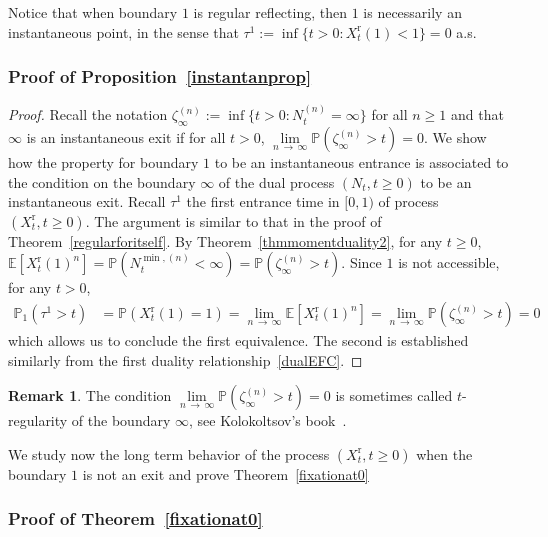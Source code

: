 \documentclass[10pt]{amsart}
\theoremstyle{definition}\newtheorem{defi}[theo]{Definition}\newtheorem{rema}[theo]{Remark}\newtheorem{exam}[theo]{Example}\newtheorem{exem}[theo]{Example}\newtheorem{nota}[theo]{Notation}
\newcommand{\rmr}{\mathrm{r}}
\newcommand{\bbE}{\mathbb{E}}
\newcommand{\bbP}{\mathbb{P}}
\begin{document}
Notice that when boundary $1$ is regular reflecting, then $1$ is necessarily an instantaneous point, in the sense that $\tau^{1}:=\inf\{t>0: X_t^{\rmr}(1)<1\}=0$ a.s.


\subsubsection{Proof of Proposition~\ref{instantanprop}}

\begin{proof}
Recall the notation $\zeta_\infty^{(n)}:=\inf\{t>0: N_t^{(n)}=\infty\}$ for all $n\geq 1$ and that $\infty$ is an instantaneous exit if for all $t>0$, $\underset{n\,\rightarrow\,\infty}{\lim} \bbP(\zeta_\infty^{(n)}>t)=0$. We show how the property for boundary $1$ to be an instantaneous entrance is associated to the condition on the boundary $\infty$ of the dual process $(N_t,t\geq 0)$ to be an instantaneous exit. Recall $\tau^1$ the first entrance time in $[0,1)$ of process $(X_t^{\rmr},t\geq 0)$. The argument is similar to that in the proof of Theorem~\ref{regularforitself}. By Theorem~\ref{thmmomentduality2}, for any $t\geq 0$, $\bbE[X^{\rmr}_t(1)^{n}]=\bbP(N_t^{\min,(n)}<\infty)=\bbP(\zeta^{(n)}_\infty>t)$. Since $1$ is not accessible, for any $t>0$,
\begin{align*}
\bbP_1\left(\tau^1>t\right)&=\bbP\left(X_t^{\rmr}(1)=1\right)=\underset{n\,\rightarrow\,\infty}{\lim}\bbE\left[X^{\rmr}_t(1)^{n}\right]=\underset{n\,\rightarrow\,\infty}{\lim} \bbP\left(\zeta^{(n)}_\infty>t\right)=0
\end{align*}
which allows us to conclude the first equivalence. The second is established similarly from the first duality relationship~\eqref{dualEFC}. 
\end{proof}

\begin{rema}
The condition $\underset{n\,\rightarrow\,\infty}{\lim} \bbP(\zeta_\infty^{(n)}>t)=0$ is sometimes called $t$-regularity of the boundary $\infty$, see Kolokoltsov's book~\cite[Section~6.1, page~273]{MarkovProcessesSemigroupsandGenerators}.
\end{rema}

We study now the long term behavior of the process $(X_t^{\rmr},t\geq 0)$ when the boundary $1$ is not an exit and prove Theorem~\ref{fixationat0}

\subsubsection{Proof of Theorem~\ref{fixationat0}}
\end{document}
